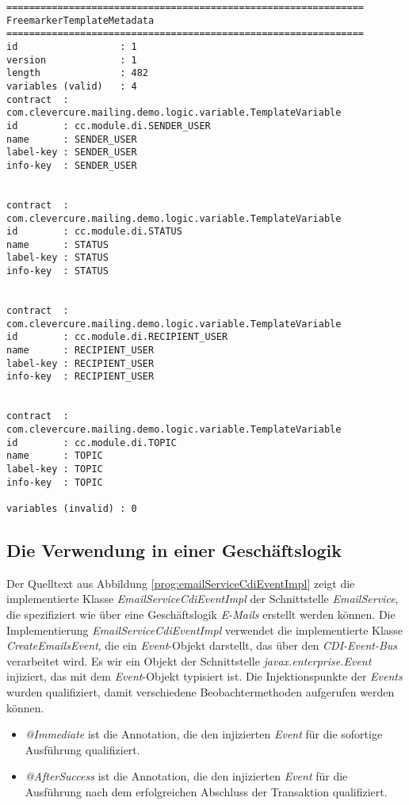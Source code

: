 \begingroup
    \fontsize{9pt}{11pt}\selectfont
    \begin{verbatim}  
===============================================================
FreemarkerTemplateMetadata
===============================================================
id                  : 1
version             : 1
length              : 482
variables (valid)   : 4
contract  : com.clevercure.mailing.demo.logic.variable.TemplateVariable
id        : cc.module.di.SENDER_USER
name      : SENDER_USER
label-key : SENDER_USER
info-key  : SENDER_USER


contract  : com.clevercure.mailing.demo.logic.variable.TemplateVariable
id        : cc.module.di.STATUS
name      : STATUS
label-key : STATUS
info-key  : STATUS


contract  : com.clevercure.mailing.demo.logic.variable.TemplateVariable
id        : cc.module.di.RECIPIENT_USER
name      : RECIPIENT_USER
label-key : RECIPIENT_USER
info-key  : RECIPIENT_USER


contract  : com.clevercure.mailing.demo.logic.variable.TemplateVariable
id        : cc.module.di.TOPIC
name      : TOPIC
label-key : TOPIC
info-key  : TOPIC

variables (invalid) : 0
    \end{verbatim}  
\endgroup

\subsection{Die Verwendung in einer Geschäftslogik}
Der Quelltext aus Abbildung \ref{prog:emailServiceCdiEventImpl} zeigt die implementierte Klasse \emph{EmailServiceCdiEventImpl} der Schnittstelle \emph{EmailService}, die spezifiziert wie über eine Geschäftslogik \emph{E-Mails} erstellt werden können. Die Implementierung \emph{EmailServiceCdiEventImpl} verwendet die implementierte Klasse \emph{CreateEmailsEvent}, die ein \emph{Event}-Objekt darstellt, das über den \emph{CDI-Event-Bus} verarbeitet wird. Es wir ein Objekt der Schnittstelle \emph{javax.enterprise.Event} injiziert, das mit dem \emph{Event}-Objekt typisiert ist. Die Injektionspunkte der \emph{Events} wurden qualifiziert, damit verschiedene Beobachtermethoden aufgerufen werden können.
\begin{itemize}
	\item\emph{@Immediate}
	\newline
	ist die Annotation, die den injizierten \emph{Event} für die sofortige Ausführung qualifiziert.
	\item\emph{@AfterSuccess}
	\newline
	ist die Annotation, die den injizierten \emph{Event} für die Ausführung nach dem erfolgreichen Abschluss der Transaktion qualifiziert.
\end{itemize}
\ \newpage

